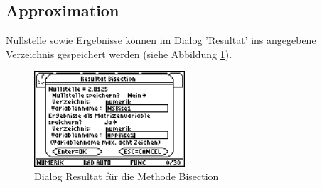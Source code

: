 \documentclass[a4paper,10pt]{scrreprt}
\begin{document}
\newpage
\subsection{Approximation}
Nullstelle sowie Ergebnisse k\"onnen im Dialog 'Resultat’ ins angegebene Verzeichnis gespeichert werden (siehe Abbildung \ref{fig:ResultatApproximationBisection}).
\begin{figure}[h]
  \centering
  \includegraphics[width=0.5\textwidth]{img/nummeth_image034.png}
  \caption{Dialog Resultat f\"ur die Methode Bisection}
  \label{fig:ResultatApproximationBisection}
\end{figure}

\end{document}
